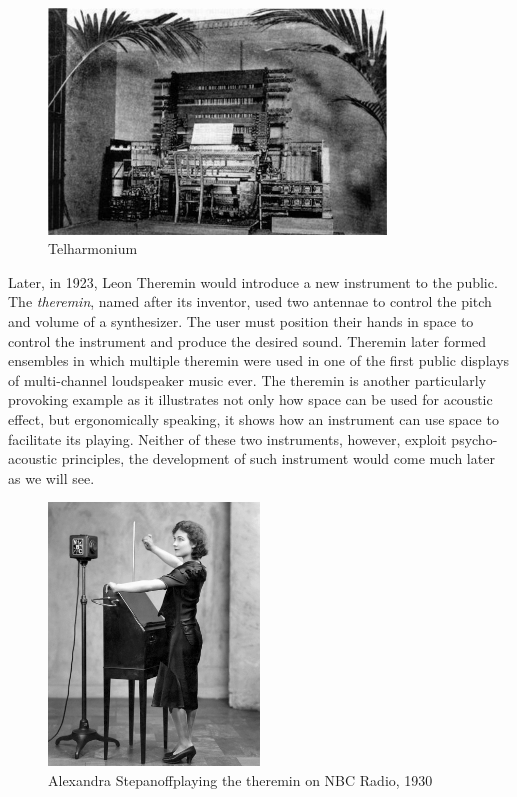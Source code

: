 \begin{figure}[ht!]%
\centering
\includegraphics[width=0.8\textwidth]{img/telharmonium.jpg} 
\caption{Telharmonium \cite{Telharmo82:online}}
\end{figure}

Later, in 1923, Leon Theremin would introduce a new instrument to the public. The \textit{theremin}, named after its inventor, used two antennae to control the pitch and volume of a synthesizer. The user must position their hands in space to control the instrument and produce the desired sound. Theremin later formed ensembles in which multiple theremin were used in one of the first public displays of multi-channel loudspeaker music ever. The theremin is another particularly provoking example as it illustrates not only how space can be used for acoustic effect, but ergonomically speaking, it shows how an instrument can use space to facilitate its playing. Neither of these two instruments, however, exploit psycho-acoustic principles, the development of such instrument would come much later as we will see. %

\begin{figure}[h!]%
\centering
\includegraphics[width=0.5\textwidth]{img/theremin.jpg} 
\caption{Alexandra Stepanoff\protect\footnotemark playing the theremin on NBC Radio, 1930 \cite{Theramin45:online}}
\end{figure}

